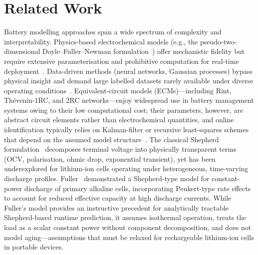 \documentclass[5p,times,number]{elsarticle}
\begin{document}
\section{Related Work}\label{sec:related}
Battery modelling approaches span a wide spectrum of complexity and interpretability.
Physics-based electrochemical models (e.g., the pseudo-two-dimensional Doyle--Fuller--Newman formulation~\cite{Doyle1993,Newman2004}) offer mechanistic fidelity but require extensive parameterisation and prohibitive computation for real-time deployment~\cite{Mama2025}.
Data-driven methods (neural networks, Gaussian processes) bypass physical insight and demand large labelled datasets rarely available under diverse operating conditions~\cite{Chemali2018,Richardson2017,Xu2012ECM,Lipu2021}.
Equivalent-circuit models (ECMs)---including Rint, Th\'{e}venin-1RC, and 2RC networks---enjoy widespread use in battery management systems owing to their low computational cost; their parameters, however, are abstract circuit elements rather than electrochemical quantities, and online identification typically relies on Kalman-filter or recursive least-squares schemes that depend on the assumed model structure~\cite{Hu2012,Plett2004,You2018,He2012ECM,Birkl2015}.
The classical Shepherd formulation~\cite{Shepherd1965} decomposes terminal voltage into physically transparent terms (OCV, polarisation, ohmic drop, exponential transient), yet has been underexplored for lithium-ion cells operating under heterogeneous, time-varying discharge profiles.
Fuller~\cite{Fuller2014} demonstrated a Shepherd-type model for constant-power discharge of primary alkaline cells, incorporating Peukert-type rate effects to account for reduced effective capacity at high discharge currents.
While Fuller's model provides an instructive precedent for analytically tractable Shepherd-based runtime prediction, it assumes isothermal operation, treats the load as a scalar constant power without component decomposition, and does not model aging---assumptions that must be relaxed for rechargeable lithium-ion cells in portable devices.
\end{document}
